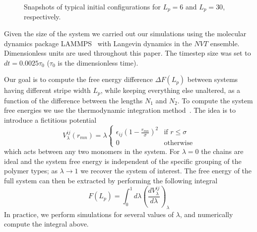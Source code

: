 \begin{figure}
	\caption[Snapshots of initial configurations for $L_p = 6$ and $L_p = 30$]{Snapshots of typical initial configurations for $L_p = 6$ and $L_p = 30$, respectively.}\label{snap}
\end{figure}

Given the size of the system we carried out our simulations using the  molecular dynamics package  {\sc LAMMPS}~\cite{lammps} with Langevin dynamics in the $NVT$ ensemble. Dimensionless units are used throughout this paper. The timestep size was set to $dt=0.0025\tau_0$ ($\tau_0$ is the dimensionless time).

Our goal is to compute the free energy difference $\Delta F(L_p)$ between systems having different stripe width $L_p$, while keeping
everything else unaltered, as a function of the difference between the lengths $N_1$ and $N_2$. To compute the system free energies 
we use  the thermodynamic integration method~\cite{FrenkelBook}.
The idea is to introduce a fictitious potential 
\begin{equation}
V^{ij}_{\lambda}(r_{mn}) = \lambda
	\begin{cases}
		\epsilon_{ij} \left(1-\frac{r_{mn}}{\sigma}\right)^2 & \textrm{if $r \leq \sigma$} \\
		0 & \textrm{otherwise}
	\end{cases}
\end{equation}
which acts between any two monomers in the system. For $\lambda=0$ the chains are ideal and the system free energy is independent of
the specific grouping of the polymer types;  as $\lambda\rightarrow 1$ we recover the system of interest. 
The free energy of the full system can then be extracted by performing the following integral 
\begin{equation}
 F(L_p)=\int_0^{1}d\lambda \left(\frac{d V^{ij}_{\lambda}}{d\lambda}\right)_{\lambda}
 \end{equation}
In practice, we perform simulations for several values of $\lambda$, and numerically compute the integral above. 

